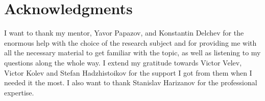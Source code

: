 \documentclass[11pt, a4paper]{article}
\theoremstyle{definition}
\begin{document}
\section{Acknowledgments}
I want to thank my mentor, Yavor Papazov, and Konstantin Delchev for the enormous help with the choice of the research subject and for providing me with all the necessary material to get familiar with the topic, as well as listening to my questions along the whole way. I extend my gratitude towards Victor Velev, Victor Kolev and Stefan Hadzhistoikov for the support I got from them when I needed it the most. I also want to thank Stanislav Harizanov for the professional expertise.
\nocite{*}


\end{document}

